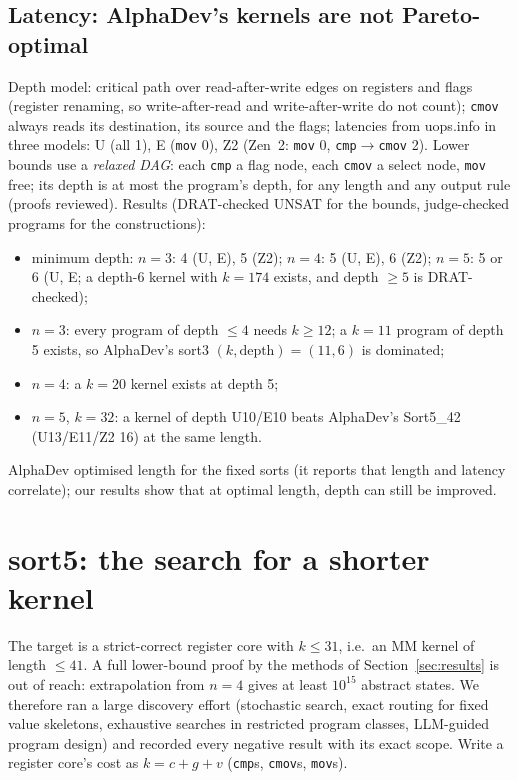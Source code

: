 \documentclass[11pt]{article}
\theoremstyle{remark}\newtheorem{remark}[theorem]{Remark}
\begin{document}
\subsection{Latency: AlphaDev's kernels are not Pareto-optimal}\label{sec:latency}
Depth model: critical path over read-after-write edges on registers and flags (register renaming, so write-after-read and
write-after-write do not count); \texttt{cmov} always reads its destination, its source and the flags; latencies from
uops.info in three models: U (all 1), E (\texttt{mov} 0), Z2 (Zen~2: \texttt{mov} 0, \texttt{cmp}$\to$\texttt{cmov} 2).
Lower bounds use a \emph{relaxed DAG}: each \texttt{cmp} a flag node, each \texttt{cmov} a select node, \texttt{mov} free;
its depth is at most the program's depth, for any length and any output rule (proofs reviewed). Results (DRAT-checked UNSAT
for the bounds, judge-checked programs for the constructions):
\begin{itemize}
\item minimum depth: $n=3$: 4 (U, E), 5 (Z2); $n=4$: 5 (U, E), 6 (Z2); $n=5$: 5 or 6 (U, E; a depth-6 kernel with $k = 174$ exists, and depth $\ge 5$ is DRAT-checked);
\item $n=3$: every program of depth $\le 4$ needs $k \ge 12$; a $k=11$ program of depth 5 exists, so AlphaDev's sort3
$(k, \text{depth}) = (11, 6)$ is dominated;
\item $n=4$: a $k = 20$ kernel exists at depth 5;
\item $n=5$, $k=32$: a kernel of depth U10/E10 beats AlphaDev's Sort5\_42 (U13/E11/Z2 16) at the same length.
\end{itemize}
AlphaDev optimised length for the fixed sorts (it reports that length and latency correlate); our results show that at
optimal length, depth can still be improved.

\section{sort5: the search for a shorter kernel}\label{sec:sort5}
The target is a strict-correct register core with $k \le 31$, i.e.\ an MM kernel of length $\le 41$. A full lower-bound
proof by the methods of Section~\ref{sec:results} is out of reach: extrapolation from $n = 4$ gives at least $10^{15}$
abstract states. We therefore ran a large discovery effort (stochastic search, exact routing for fixed value skeletons,
exhaustive searches in restricted program classes, LLM-guided program design) and recorded every negative result with its
exact scope. Write a register core's cost as $k = c + g + v$ (\texttt{cmp}s, \texttt{cmov}s, \texttt{mov}s).
\end{document}
